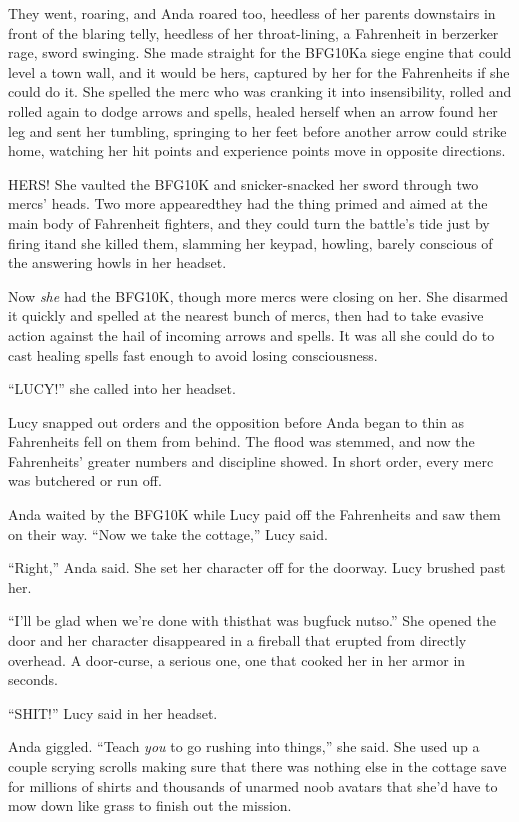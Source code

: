 They went, roaring, and Anda roared too, heedless of her parents
downstairs in front of the blaring telly, heedless of her
throat-lining, a Fahrenheit in berzerker rage, sword swinging. She
made straight for the BFG10K\dash{}a siege engine that could level a town
wall, and it would be hers, captured by her for the Fahrenheits if
she could do it. She spelled the merc who was cranking it into
insensibility, rolled and rolled again to dodge arrows and spells,
healed herself when an arrow found her leg and sent her tumbling,
springing to her feet before another arrow could strike home,
watching her hit points and experience points move in opposite
directions.

HERS! She vaulted the BFG10K and snicker-snacked her sword through
two mercs’ heads. Two more appeared\dash{}they had the thing primed and
aimed at the main body of Fahrenheit fighters, and they could turn
the battle’s tide just by firing it\dash{}and she killed them, slamming
her keypad, howling, barely conscious of the answering howls in her
headset.

Now \emph{she} had the BFG10K, though more mercs were closing on
her. She disarmed it quickly and spelled at the nearest bunch of
mercs, then had to take evasive action against the hail of incoming
arrows and spells. It was all she could do to cast healing spells
fast enough to avoid losing consciousness.

“LUCY!” she called into her headset. 

Lucy snapped out orders and the opposition before Anda began to
thin as Fahrenheits fell on them from behind. The flood was
stemmed, and now the Fahrenheits’ greater numbers and discipline
showed. In short order, every merc was butchered or run off.

Anda waited by the BFG10K while Lucy paid off the Fahrenheits and
saw them on their way. “Now we take the cottage,” Lucy said.

“Right,” Anda said. She set her character off for the doorway. Lucy
brushed past her.

“I’ll be glad when we’re done with this\dash{}that was bugfuck nutso.”
She opened the door and her character disappeared in a fireball
that erupted from directly overhead. A door-curse, a serious one,
one that cooked her in her armor in seconds.

“SHIT!” Lucy said in her headset.

Anda giggled. “Teach \emph{you} to go rushing into things,” she
said. She used up a couple scrying scrolls making sure that there
was nothing else in the cottage save for millions of shirts and
thousands of unarmed noob avatars that she’d have to mow down like
grass to finish out the mission.


